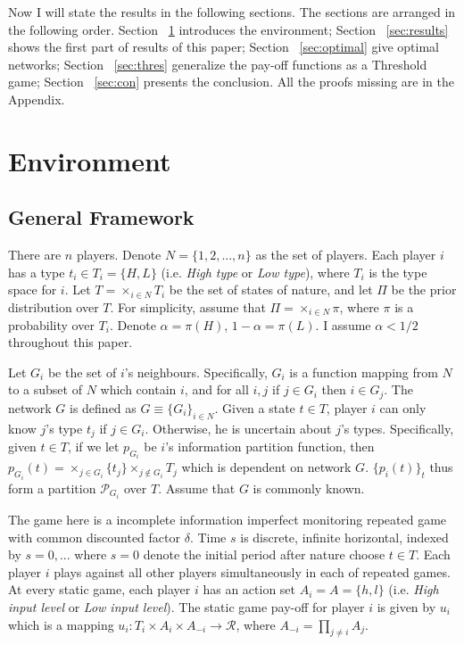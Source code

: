 \documentclass[12pt,letter]{article}
\theoremstyle{remark}
\theoremstyle{remark}
\theoremstyle{claim}
\begin{document}
Now I will state the results in the following sections. The sections are arranged in the following order. Section ~\ref{sec:enviro} introduces the environment; Section ~\ref{sec:results} shows the first part of results of this paper; Section ~\ref{sec:optimal} give optimal networks; Section ~\ref{sec:thres} generalize the pay-off functions as a Threshold game; Section ~\ref{sec:con} presents the conclusion. All the proofs missing are in the Appendix.



\section{Environment}
\label{sec:enviro}
\subsection{General Framework}
There are $n$ players. Denote $N=\{1,2,...,n\}$ as the set of players. Each player $i$ has a type $t_i\in T_i=\{H,L\}$ (i.e. \textit{High type} or \textit{Low type}), where $T_i$ is the type space for $i$. Let $T=\times_{i\in N} T_i$ be the set of states of nature, and let $\Pi$ be the prior distribution over $T$. For simplicity, assume that $\Pi=\times_{i\in N} \pi$, where $\pi$ is a probability over $T_i$. Denote $\alpha=\pi (H)$, $1-\alpha=\pi (L)$. I assume $\alpha<1/2$ throughout this paper.

Let $G_i$ be the set of $i$'s neighbours. Specifically, $G_i$ is a function mapping from $N$ to a subset of $N$ which contain $i$, and for all $i,j$ if $j\in G_i$ then $i\in G_j$. The network $G$ is defined as $G\equiv \{G_i\}_{i\in N}$. Given a state $t\in T$, player $i$ can only know $j$'s type $t_j$ if $j\in G_i$. Otherwise, he is uncertain about $j$'s types. Specifically, given $t\in T$, if we let $p_{G_i}$ be $i$'s information partition function, then $p_{G_i}(t)=\times_{j\in G_i}\{t_j\}\times_{j\notin G_i}T_j$ which is dependent on network $G$. $\{p_i(t)\}_t$ thus form a partition $\mathcal{P}_{G_i}$ over $T$. Assume that $G$ is commonly known.

The game here is a incomplete information imperfect monitoring repeated game with common discounted factor $\delta$. Time $s$ is discrete, infinite horizontal, indexed by $s=0,...$ where $s=0$ denote the initial period after nature choose $t\in T$. Each player $i$ plays against all other players simultaneously in each of repeated games. At every static game, each player $i$ has an action set $A_i=A=\{h,l\}$ (i.e. \textit{High input level} or \textit{Low input level}). The static game pay-off for player $i$ is given by $u_i$ which is a mapping $u_i: T_i\times A_i\times A_{-i}\rightarrow \mathcal{R}$, where $A_{-i}=\prod_{j\neq i}A_j$. 
\end{document}
